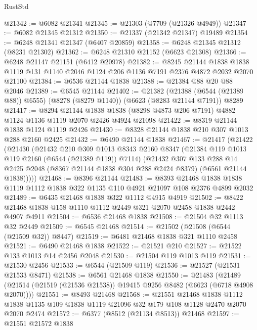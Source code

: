 \begin{lexlean}{RustStd}
\begin{coremodule}
@21342 := @6082 @21341
@21345 := @21303 (@7709 (@21326 @4949))
@21347 := @6082 @21345 @21312
@21350 := @21337 (@21342 @21347) @19489
@21354 := @6248 @21341 @21347 (@6407 @20859)
@21358 := @6248 @21345 @21312 (@8231 @21302)
@21362 := @6248 @21310 @21152 (@6623 @21308)
@21366 := @6248 @21147 @21151 (@6412 @20978)
@21382 := @8245
    @21144
    @1838
    @1838
    @1119
    @131
    @1140
    @2046
    @1124
    @206
    @1136
    @7191
    @2376
    @4872
    @2032
    @2070
    @21100
@21384 := @6536 @21144 @1838
@21388 := @21384 @88 @20 @88 @2046
@21389 := @6545 @21144
@21402 := @21382
    (@21388 (@6544 (@21389 @88)) @6555)
    (@8278 (@8279 @1140))
    (@6623 (@8283 @21144 @7191))
    @8289
@21417 := @8294
    @21144
    @1838
    @1838
    (@8298 @4873 @206 @7191)
    @4882
    @1124
    @1136
    @1119
    @2070
    @2426
    @4924
    @21098
@21422 := @8319 @21144 @1838 @1124 @1119 @2426
@21430 := @8328 @21144 @1838 @210 @307 @1013 @288 @2160 @2425
@21432 := @6490 @21144 @1838
@21467 := @21417
    (@21422
      (@21430
        (@21432
          @210
          @309
          @1013
          @8343
          @2160
          @8347
          (@21384 @119 @1013 @119 @2160 (@6544 (@21389 @119)) @7114)
          (@21432
            @307
            @133
            @288
            @14
            @2425
            @2048
            (@8367 @21144 @1838 @304 @288 @2424 @8379)
            (@6561 @21144 @1838)))))
@21468 := @8396 @21144
@21483 := @8393
    @21468
    @1838
    @1838
    @1119
    @1112
    @1838
    @322
    @1135
    @110
    @4921
    @21097
    @108
    @2376
    @4899
    @2032
@21489 := @6435 @21468 @1838 @322 @1112 @4915 @4919
@21502 := @8422 @21468 @1838 @158 @1110 @1112 @2449 @321 @2070 @2458 @1838 @2442 @4907 @4911
@21504 := @6536 @21468 @1838
@21508 := @21504 @32 @1113 @32 @2449
@21509 := @6545 @21468
@21514 := @21502 (@21508 (@6544 (@21509 @32)) @8447)
@21519 := @6481 @21468 @1838 @321 @1110 @2458
@21521 := @6490 @21468 @1838
@21522 := @21521 @210
@21527 := @21522 @133 @1013 @14 @2456 @2048
@21530 := @21504 @119 @1013 @119
@21531 := @21530 @2456
@21533 := @6544 (@21509 @119)
@21536 := @21527 (@21531 @21533 @8471)
@21538 := @6561 @21468 @1838
@21550 := @21483
    (@21489 (@21514 (@21519 (@21536 @21538)) @19415 @9256 @8482 (@6623 (@6718 @4908 @2070))))
@21551 := @8493 @21468
@21568 := @21551
    @21468
    @1838
    @1112
    @1838
    @1135
    @109
    @1838
    @1119
    @21096
    @32
    @179
    @108
    @1128
    @2470
    @2070
    @2070
    @2474
@21572 := @6377 (@8512 (@21134 @8513)) @21468
@21597 := @21551
    @21572
    @1838

\end{coremodule}
\end{lexlean}

